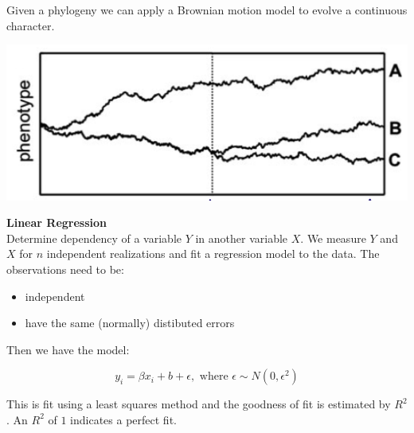 \documentclass{article}
\begin{document}
\begin{multicols*}{3}
Given a phylogeny we can apply a Brownian motion model to evolve a continuous character. 

\begin{center}
    \includegraphics[width=1\linewidth, angle=0.6]{brownphyl.png}
\end{center}

\begin{mdframed}[backgroundcolor=astral] 
    \textbf{Linear Regression}\\
    Determine dependency of a variable $Y$ in another variable $X$. We measure $Y$ and $X$ for $n$ independent realizations and fit a regression model to the data. The observations need to be:
    \begin{itemize}
        \item independent
        \item have the same (normally) distibuted errors
    \end{itemize}
    
    Then we have the model: 
    
    $$y_i = \beta x_i + b + \epsilon, \text{ where } \epsilon \sim N(0, \epsilon^2)$$
    
    This is fit using a least squares method and the goodness of fit is estimated by $R^2$. An $R^2$ of $1$ indicates a perfect fit. 
\end{mdframed}

\end{multicols*}
\end{document}
